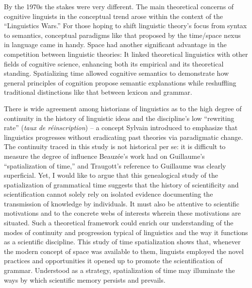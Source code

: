 \documentclass[output=paper]{langsci/langscibook}
\begin{document}
By the 1970s the stakes were very different. The main theoretical concerns of cognitive linguists in the conceptual trend arose within the context of the “Linguistics Wars.” For those hoping to shift linguistic theory’s focus from syntax to semantics, conceptual paradigms like that proposed by the time/space nexus in language came in handy. Space had another significant advantage in the competition between linguistic theories: It linked theoretical linguistics with other fields of cognitive science, enhancing both its empirical and its theoretical standing. Spatializing time allowed cognitive semantics to demonstrate how general principles of cognition propose semantic explanations while reshuffling traditional distinctions like that between lexicon and grammar. 

There is wide agreement among historians of linguistics as to the high degree of continuity in the history of linguistic ideas and the discipline’s low “rewriting rate” (\textit{taux de réinscription}) -- a concept Sylvain \citet{auroux_histoire_1980} introduced to emphasize that linguistics progresses without eradicating past theories via paradigmatic change. The continuity traced in this study is not historical per se: it is difficult to measure the degree of influence Beauzée’s work had on Guillaume’s “spatialization of time,” and Traugott’s reference to Guillaume was clearly superficial. Yet, I would like to argue that this genealogical study of the spatialization of grammatical time suggests that the history of scientificity \citep{auroux_techne_1990} and scientification cannot solely rely on isolated evidence documenting the transmission of knowledge by individuals. It must also be attentive to scientific motivations and to the concrete webs of interests wherein these motivations are situated. Such a theoretical framework could enrich our understanding of the modes of continuity and progression typical of linguistics and the way it functions as a scientific discipline. This study of time spatialization shows that, whenever the modern concept of space was available to them, linguists employed the novel practices and opportunities it opened up to promote the scientification of grammar. Understood as a strategy, spatialization of time may illuminate the ways by which scientific memory persists and prevails.


{\sloppy\printbibliography[heading=subbibliography,notkeyword=this]}
\end{document}
